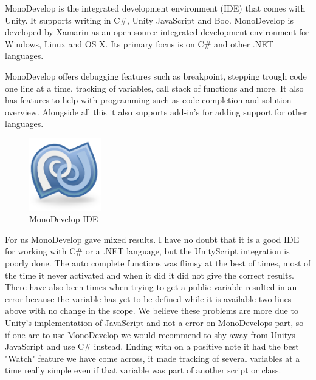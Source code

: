 MonoDevelop is the integrated development environment (IDE) that comes with Unity. It supports writing in C\#, Unity JavaScript and Boo.
MonoDevelop is developed by Xamarin \cite{xamarinRef} as an open source integrated development environment for Windows, Linux and OS X.
Its primary focus is on C\# and other .NET languages.


MonoDevelop offers debugging features such as breakpoint, stepping trough code one line at a time, tracking of variables, call stack of functions and more.
It also has features to help with programming such as code completion and solution overview. Alongside all this it also supports add-in's for adding support for other languages.


\begin{figure}
	\capstart
	\centering
	\vspace{-10pt}
	\includegraphics[width=0.28\textwidth]{images/MonoDevelopLogo.png}
	\vspace{-20pt}
	\caption[MonoDevelop IDE Logo]{{M}ono{D}evelop {IDE}}
	\label{fig:monodevelop}
	\vspace{-10px}
\end{figure}

For us MonoDevelop gave mixed results. 
I have no doubt that it is a good IDE for working with C\# or a .NET language, but the UnityScript integration is poorly done.
The auto complete functions was flimsy at the best of times, most of the time it never activated and when it did it did not give the correct results. 
There have also been times when trying to get a public variable resulted in an error because the variable has yet to be defined while it is available two lines above with no change in the scope.
We believe these problems are more due to Unity's implementation of JavaScript and not a error on MonoDevelops part, so if one are to use MonoDevelop we would recommend to shy away from Unitys JavaScript and use C\# instead.
Ending with on a positive note it had the best "Watch" feature we have come across, it made tracking of several variables at a time really simple even if that variable was part of another script or class.	
